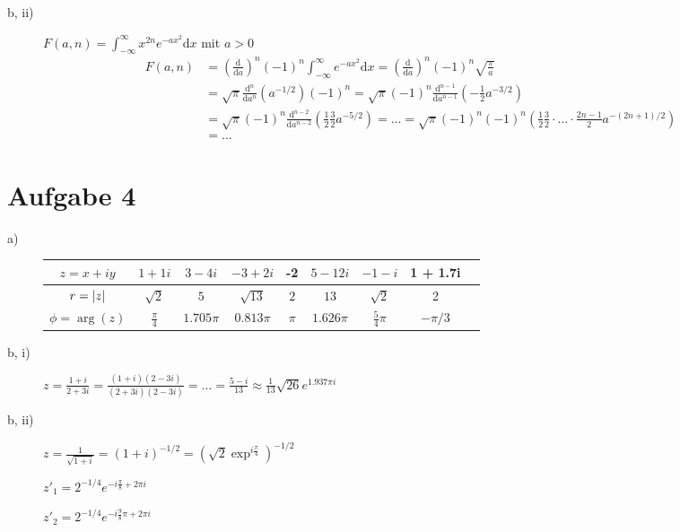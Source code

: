 \begin{description}
	\item[b, ii)]  $F(a, n) = \int^\infty_{-\infty} x^{2n} e^{-ax^2} \mathrm{d} x$ mit $a > 0$
	\begin{align*}
			F(a, n) 
			&= \left( \frac{\mathrm{d}}{\mathrm{d} a} \right)^n (-1)^n \int^{\infty}_{-\infty} e^{-ax^2} \mathrm{d} x
			= \left( \frac{\mathrm{d}}{\mathrm{d} a} \right)^n (-1)^n \sqrt{\frac{\pi}{a}} \\
			&=  \sqrt{\pi} \frac{\mathrm{d}^n}{\mathrm{d} a^n} \left( a^{-1/2} \right) (-1)^n
			= \sqrt{\pi} (-1)^n \frac{\mathrm{d}^{n -1}}{\mathrm{d} a^{n - 1}} \left( -\frac{1}{2} a^{-3/2} \right) \\
			&= \sqrt{\pi} (-1)^n \frac{\mathrm{d}^{n - 2}}{\mathrm{d} a^{n - 2}} \left( \frac{1}{2} \frac{3}{2} a^{-5/2} \right) 
			= \dots 
			= \sqrt{\pi} (-1)^n (-1)^n \left( \frac{1}{2} \frac{3}{2} \cdot \hdots \cdot \frac{2n - 1}{2} a^{-(2n + 1)/2} \right) \\
			&= \dots
	\end{align*}
\end{description}

\section*{Aufgabe 4}

\begin{description}
	\item[a)] 
	\begin{tabular}{|c||c|c|c|c|c|c|c|c|}
		\hline 
		$z = x + iy$ & $1 + 1i$ & $3 - 4i$ & $-3 + 2i$ & -2 & $5 - 12 i$ & $-1 - i$ & 1 + 1.7i \\
		\hline
		$r = \left\lvert z \right\rvert$ & $\sqrt{2}$ & $5$ & $\sqrt{13}$ & $2$ & $13$ & $\sqrt{2}$ & 2 \\
		\hline 
		$\phi = \arg(z)$ & $\frac{\pi}{4}$ & $1.705 \pi$ & $0.813 \pi$ & $\pi$ & $1.626 \pi$ & $\frac{5}{4} \pi$ & $-\pi/3$ \\
		\hline 
	\end{tabular}
 
	\item[b, i)] $z = \frac{1 + i}{2 + 3i} = \frac{(1 + i)(2 - 3i)}{(2 + 3i)(2 - 3i)} = \dots = \frac{5 - i}{13} \approx \frac{1}{13} \sqrt{26} e^{1.937 \pi i}$
	
	\item[b, ii)] $z = \frac{1}{\sqrt{1 + i}} = (1 + i)^{-1/2} = \left( \sqrt{2}\exp^{i \frac{\pi}{4}} \right)^{-1/2}$
	
		$z'_1 = 2^{-1/4} e^{-i \frac{\pi}{8} + 2 \pi i}$
		
		$z'_2 = 2^{-1/4} e^{-i \frac{9}{8} \pi + 2 \pi i}$
\end{description}

